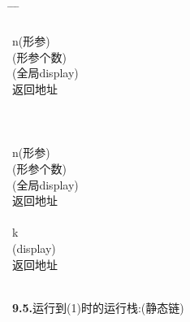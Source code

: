 \documentclass{article}
\begin{document}
\begin{tabbing}
    \hspace{1.5cm} \= \hspace{1.5cm} \= \hspace{1.5cm} \= \kill
     \\

     \\

     \> n(形参)\\

     (形参个数)\\

     (全局display)\\

     \> 返回地址\\

     \\

     \\

     \\

     \> n(形参)\\

     (形参个数)\\

     (全局display)\\

     \> 返回地址\\

      \\

     \> k\\

     (display)\\

     \> 返回地址\\

     \\
\end{tabbing}

\textbf{9.5.}运行到(1)时的运行栈:(静态链)
\end{document}
